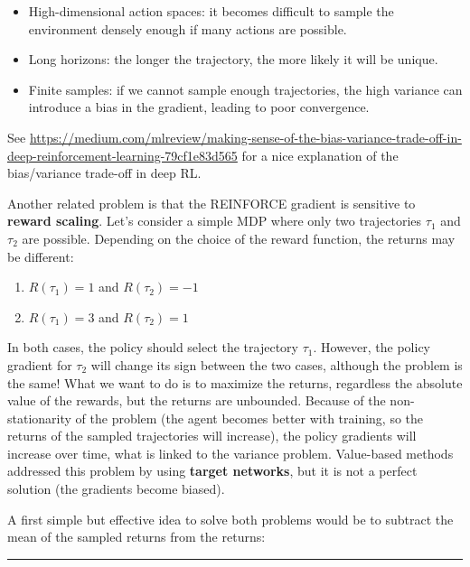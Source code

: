 \documentclass[
  letterpaper,
  DIV=11,
  numbers=noendperiod]{scrreprt}
\providecommand{\tightlist}{%
  \setlength{\itemsep}{0pt}\setlength{\parskip}{0pt}}\usepackage{longtable,booktabs,array}
\begin{document}
\begin{itemize}
\tightlist
\item
  High-dimensional action spaces: it becomes difficult to sample the
  environment densely enough if many actions are possible.
\item
  Long horizons: the longer the trajectory, the more likely it will be
  unique.
\item
  Finite samples: if we cannot sample enough trajectories, the high
  variance can introduce a bias in the gradient, leading to poor
  convergence.
\end{itemize}

See
\url{https://medium.com/mlreview/making-sense-of-the-bias-variance-trade-off-in-deep-reinforcement-learning-79cf1e83d565}
for a nice explanation of the bias/variance trade-off in deep RL.

Another related problem is that the REINFORCE gradient is sensitive to
\textbf{reward scaling}. Let's consider a simple MDP where only two
trajectories \(\tau_1\) and \(\tau_2\) are possible. Depending on the
choice of the reward function, the returns may be different:

\begin{enumerate}
\def\labelenumi{\arabic{enumi}.}
\tightlist
\item
  \(R(\tau_1) = 1\) and \(R(\tau_2) = -1\)
\item
  \(R(\tau_1) = 3\) and \(R(\tau_2) = 1\)
\end{enumerate}

In both cases, the policy should select the trajectory \(\tau_1\).
However, the policy gradient for \(\tau_2\) will change its sign between
the two cases, although the problem is the same! What we want to do is
to maximize the returns, regardless the absolute value of the rewards,
but the returns are unbounded. Because of the non-stationarity of the
problem (the agent becomes better with training, so the returns of the
sampled trajectories will increase), the policy gradients will increase
over time, what is linked to the variance problem. Value-based methods
addressed this problem by using \textbf{target networks}, but it is not
a perfect solution (the gradients become biased).

A first simple but effective idea to solve both problems would be to
subtract the mean of the sampled returns from the returns:

\begin{center}\rule{0.5\linewidth}{0.5pt}\end{center}
\end{document}
